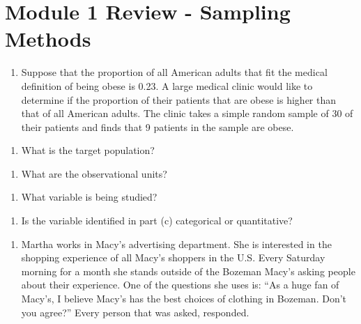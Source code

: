 \documentclass[
]{report}
\providecommand{\tightlist}{%
  \setlength{\itemsep}{0pt}\setlength{\parskip}{0pt}}
\begin{document}
\newpage

\section{Module 1 Review - Sampling Methods}\label{module-1-review---sampling-methods}

\begin{enumerate}
\def\labelenumi{\arabic{enumi}.}
\tightlist
\item
  Suppose that the proportion of all American adults that fit the medical definition of being obese is 0.23. A large medical clinic would like to determine if the proportion of their patients that are obese is higher than that of all American adults. The clinic takes a simple random sample of 30 of their patients and finds that 9 patients in the sample are obese.
\end{enumerate}

\begin{enumerate}
\def\labelenumi{\alph{enumi}.}
\tightlist
\item
  What is the target population?
\end{enumerate}

\vspace{0.4in}

\begin{enumerate}
\def\labelenumi{\alph{enumi}.}
\setcounter{enumi}{1}
\tightlist
\item
  What are the observational units?
\end{enumerate}

\vspace{0.4in}

\begin{enumerate}
\def\labelenumi{\alph{enumi}.}
\setcounter{enumi}{2}
\tightlist
\item
  What variable is being studied?
\end{enumerate}

\vspace{0.4in}

\begin{enumerate}
\def\labelenumi{\alph{enumi}.}
\setcounter{enumi}{3}
\tightlist
\item
  Is the variable identified in part (c) categorical or quantitative?
\end{enumerate}

\vspace{0.4in}

\begin{enumerate}
\def\labelenumi{\arabic{enumi}.}
\setcounter{enumi}{1}
\tightlist
\item
  Martha works in Macy's advertising department. She is interested in the shopping experience of all Macy's shoppers in the U.S. Every Saturday morning for a month she stands outside of the Bozeman Macy's asking people about their experience. One of the questions she uses is: ``As a huge fan of Macy's, I believe Macy's has the best choices of clothing in Bozeman. Don't you agree?'' Every person that was asked, responded.
\end{enumerate}
\end{document}
